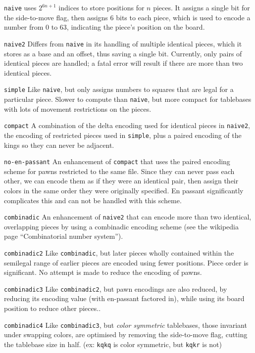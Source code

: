 \documentclass[11pt]{article}
\begin{document}
\begin{description}

\item {\tt naive} uses $2^{6n+1}$ indices to store positions for $n$ pieces.
It assigns a single bit for the side-to-move flag, then assigns 6 bits
to each piece, which is used to encode a number from 0 to 63,
indicating the piece's position on the board.

\item {\tt naive2} Differs from {\tt naive} in its handling of multiple
identical pieces, which it stores as a base and an offset, thus saving
a single bit.  Currently, only pairs of identical pieces are handled;
a fatal error will result if there are more than two identical pieces.

\item {\tt simple} Like {\tt naive}, but only assigns numbers to
squares that are legal for a particular piece.  Slower to compute than
{\tt naive}, but more compact for tablebases with lots of movement
restrictions on the pieces.

\item {\tt compact} A combination of the delta encoding used for
identical pieces in {\tt naive2}, the encoding of restricted pieces used
in {\tt simple}, plus a paired encoding of the kings so they can never be
adjacent.

\item {\tt no-en-passant} An enhancement of {\tt compact} that uses
the paired encoding scheme for pawns restricted to the same file.
Since they can never pass each other, we can encode them as if they
were an identical pair, then assign their colors in the same order
they were originally specified.  En passant significantly complicates
this and can not be handled with this scheme.

\item {\tt combinadic} An enhancement of {\tt naive2} that can encode
  more than two identical, overlapping pieces by using a combinadic
  encoding scheme (see the wikipedia page ``Combinatorial number
  system'').

\item {\tt combinadic2} Like {\tt combinadic}, but later pieces wholly
  contained within the semilegal range of earlier pieces are encoded
  using fewer positions.  Piece order is significant.  No attempt is
  made to reduce the encoding of pawns.

\item {\tt combinadic3} Like {\tt combinadic2}, but pawn encodings are
  also reduced, by reducing its encoding value (with en-passant
  factored in), while using its board position to reduce other pieces..

\item {\tt combinadic4} Like {\tt combinadic3}, but {\it color
  symmetric} tablebases, those invariant under swapping colors,
  are optimised by removing the side-to-move flag, cutting the
  tablebase size in half.  (ex: {\tt kqkq} is color symmetric,
  but {\tt kqkr} is not)

\end{description}
\end{document}
